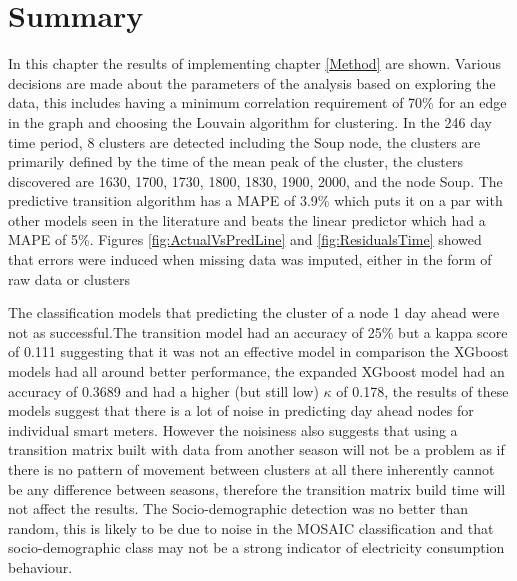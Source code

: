 \section{Summary}

In this chapter the results of implementing chapter \ref{Method} are shown. Various decisions are made about the parameters of the analysis based on exploring the data, this includes having a minimum correlation requirement of 70\% for an edge in the graph and choosing the Louvain algorithm for clustering. In the 246 day time period, 8 clusters are detected including the Soup node, the clusters are primarily defined by the time of the mean peak of the cluster, the clusters discovered are 1630, 1700, 1730, 1800, 1830, 1900, 2000, and the node Soup. The predictive transition algorithm has a MAPE of 3.9\% which puts it on a par with other models seen in the literature and beats the linear predictor which had a MAPE of 5\%. Figures \ref{fig:ActualVsPredLine} and \ref{fig:ResidualsTime} showed that errors were induced when missing data was imputed, either in the form of raw data or clusters

The classification models that predicting the cluster of a node 1 day ahead were not as successful.The transition model had an accuracy of 25\% but a kappa score of 0.111 suggesting that it was not an effective model in comparison the XGboost models had all around better performance, the expanded XGboost model had an accuracy of 0.3689 and had a higher (but still low) $\kappa$ of 0.178, the results of these models suggest that there is a lot of noise in predicting day ahead nodes for individual smart meters. However the noisiness also suggests that using a transition matrix built with data from another season will not be a problem as if there is no pattern of movement between clusters at all there inherently cannot be any difference between seasons, therefore the transition matrix build time will not affect the results. The Socio-demographic detection was no better than random, this is likely to be due to noise in the MOSAIC classification and that socio-demographic class may not be a strong indicator of electricity consumption behaviour.






